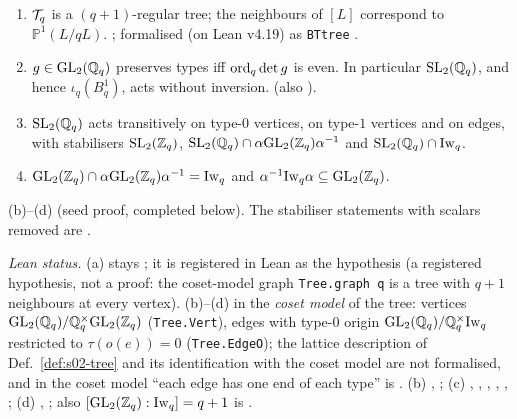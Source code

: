 \begin{lemma}\label{lem:s02-tree}\label{if:s02-tree}
\begin{enumerate}[label=(\alph*)]
\item $\mathcal{T}_q$ is a $(q+1)$-regular tree; the neighbours of $[L]$ correspond to $\mathbb P^1(L/qL)$.
  \stcited{} ; formalised (on Lean v4.19) as \texttt{BTtree}
  .
\item $g\in\mathrm{GL}_2(\mathbb{Q}_q)$ preserves types iff $\mathrm{ord}_q\det g$ is even. In particular $\mathrm{SL}_2(\mathbb{Q}_q)$, and hence
  $\iota_q(B^1_q)$, acts without inversion. \stproved{} (also ).
\item $\mathrm{SL}_2(\mathbb{Q}_q)$ acts transitively on type-$0$ vertices, on type-$1$ vertices and on edges, with
  stabilisers $\mathrm{SL}_2(\mathbb{Z}_q)$, $\mathrm{SL}_2(\mathbb{Q}_q)\cap\alpha\mathrm{GL}_2(\mathbb{Z}_q)\alpha^{-1}$ and $\mathrm{SL}_2(\mathbb{Q}_q)\cap\mathrm{Iw}_q$.
\item $\mathrm{GL}_2(\mathbb{Z}_q)\cap\alpha\mathrm{GL}_2(\mathbb{Z}_q)\alpha^{-1}=\mathrm{Iw}_q$ and $\alpha^{-1}\mathrm{Iw}_q\alpha\subseteq\mathrm{GL}_2(\mathbb{Z}_q)$.
\end{enumerate}
(b)--(d) \stproved{} (seed proof, completed below). The stabiliser statements with scalars removed are
.
\end{lemma}
\begin{sloppypar}\noindent\emph{Lean status.} (a) stays \stcited; it is registered in Lean as the hypothesis
 (a registered hypothesis, not a proof: the coset-model graph \texttt{Tree.graph q} is a tree with
$q+1$ neighbours at every vertex). (b)--(d) \stformal{} in the \emph{coset model} of the tree: vertices
$\mathrm{GL}_2(\mathbb{Q}_q)/\mathbb{Q}_q^\times\mathrm{GL}_2(\mathbb{Z}_q)$ (\texttt{Tree.Vert}), edges with type-$0$ origin $\mathrm{GL}_2(\mathbb{Q}_q)/\mathbb{Q}_q^\times\mathrm{Iw}_q$ restricted to
$\tau(o(e))=0$ (\texttt{Tree.EdgeO}); the lattice description of Def.~\ref{def:s02-tree} and its identification with the coset model
are not formalised, and in the coset model ``each edge has one end of each type'' is .
(b) , ;
(c) , ,
, , ,
;
(d) , ; also
$[\mathrm{GL}_2(\mathbb{Z}_q):\mathrm{Iw}_q]=q+1$ is .\end{sloppypar}
